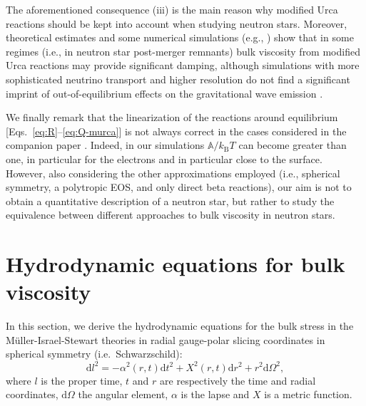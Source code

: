 \documentclass[aps,prd,twocolumn,a4paper,floatfix,nofootbib,superscriptaddress,nofootinbib]{revtex4}
\begin{document}
The aforementioned consequence (iii) is the main reason why modified Urca
reactions should be kept into account when studying neutron stars.
%
Moreover, theoretical estimates \cite{Alford18} and some numerical simulations
(e.g., \citet{Most22}) show that in some regimes (i.e., in neutron star
post-merger remnants) bulk viscosity from modified Urca reactions may provide
significant damping, although simulations with more sophisticated neutrino
transport and higher resolution do not find a significant imprint of
out-of-equilibrium effects on the gravitational wave emission \cite{Radice22,
Zappa23}.

We finally remark that the linearization of the reactions around equilibrium
[Eqs.~\eqref{eq:R}--\eqref{eq:Q-murca}] is not always correct in the cases
considered in the companion paper \cite{Camelio22b}.
%
Indeed, in our simulations $\mathbb A/k_\mathrm{B}T$ can become greater than
one, in particular for the electrons and in particular close to the surface.
However, also considering the other approximations employed (i.e., spherical
symmetry, a polytropic EOS, and only direct beta reactions), our aim is not to
obtain a quantitative description of a neutron star, but rather to study the
equivalence between different approaches to bulk viscosity in neutron stars.

\section{Hydrodynamic equations for bulk viscosity}
\label{sec:bulk-eqs}

In this section, we derive the hydrodynamic equations for the bulk stress in the
M\"uller-Israel-Stewart theories in radial gauge-polar slicing
coordinates in spherical symmetry (i.e.~Schwarzschild):
%
\begin{equation}
\label{eq:metric}
\mathrm dl^2= 
-\alpha^2(r,t)\mathrm dt^2 + X^2(r,t) \mathrm dr^2
+r^2\mathrm d\Omega^2,
\end{equation}
%
where $l$ is the proper time, $t$ and $r$ are respectively the time and radial
coordinates, $\mathrm d\Omega$ the angular element, $\alpha$ is the lapse and
$X$ is a metric function.
\end{document}
